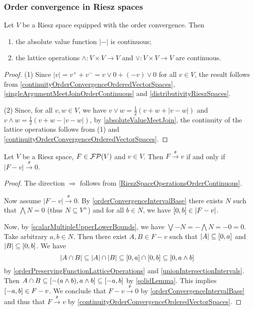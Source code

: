 \subsubsection{Order convergence in Riesz spaces}

\begin{lemma} \label{RieszSpaceOperationsOrderContinuous}
Let $V$ be a Riesz space equipped with the order convergence. Then
\begin{enumerate}
\item the absolute value function $|-|$ is continuous;
\item the lattice operations $\wedge: V\times V \to V$ and $\vee: V\times V \to V$ are continuous.
\end{enumerate}
\end{lemma}
\begin{proof}
(1) Since $|v| = v^+ + v^- = v\vee 0 + (-v)\vee 0$ for all $v\in V$, the result follows from \ref{continuityOrderConvergenceOrderedVectorSpaces}, \ref{singleArgumentMeetJoinOrderContinuous} and \ref{distributivityRieszSpaces}.

(2) Since, for all $v,w\in V$, we have $v\vee w = \frac{1}{2}(v+w + |v-w|)$ and $v\wedge w = \frac{1}{2}(v+w - |v-w|)$, by \ref{absoluteValueMeetJoin}, the continuity of the lattice operations follows from (1) and \ref{continuityOrderConvergenceOrderedVectorSpaces}.
\end{proof}

\begin{lemma} \label{orderConvergenceInRieszSpaceLemma}
Let $V$ be a Riesz space, $F\in\operatorname{\mathcal{FP}}(V)$ and $v\in V$. Then $F\overset{\mathfrak{o}}{\longrightarrow} v$ \textup{if and only if} $|F-v|\overset{\mathfrak{o}}{\longrightarrow} 0$.
\end{lemma}
\begin{proof}
The direction $\Rightarrow$ follows from \ref{RieszSpaceOperationsOrderContinuous}.

Now assume $|F-v|\overset{\mathfrak{o}}{\longrightarrow} 0$. By \ref{orderConvergenceIntervalBase} there exists $N$ such that $\bigwedge N = 0$ (thus $N\subseteq V^+$) and for all $b\in N$, we have $\interval{0,b} \in |F-v|$.

Now, by \ref{scalarMultipleUpperLowerBounds}, we have $\bigvee -N = -\bigwedge N = -0 = 0$. Take arbitrary $a, b\in N$. Then there exist $A, B\in F-v$ such that $|A| \subseteq \interval{0, a}$ and $|B|\subseteq \interval{0,b}$. We have
\[ |A\cap B| \subseteq |A|\cap |B| \subseteq \interval{0,a}\cap \interval{0,b} \subseteq \interval{0,a\wedge b} \]
by \ref{orderPreservingFunctionLatticeOperations} and \ref{unionIntersectionIntervals}. Then $A\cap B \subseteq \interval{-(a\wedge b),a\wedge b} \subseteq \interval{-a, b}$ by \ref{solidLemma}. This implies $\interval{-a,b} \in F-v$. We conclude that $F-v\overset{\mathfrak{o}}{\longrightarrow} 0$ by \ref{orderConvergenceIntervalBase} and thus that $F\overset{\mathfrak{o}}{\longrightarrow} v$ by \ref{continuityOrderConvergenceOrderedVectorSpaces}.
\end{proof}

